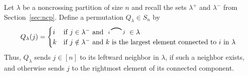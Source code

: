 \documentclass[12pt]{amsart}
\theoremstyle{definition}
\theoremstyle{remark}
\numberwithin{equation}{section}
\newcommand{\edge}[2]{\tikz[scale = 0.75, baseline = -0.2cm]{
\draw (0.1, 0) node[inner sep = 0ex] (a) {};
\node[left, xshift = 0.1cm, yshift = -0.1cm] at (a) {$\scriptstyle #1$};
\draw (0.9, 0)  node[inner sep = 0ex] (b) {};
\node[right, xshift = -0.1cm, yshift = -0.1cm] at (b) {$\scriptstyle #2$};
\draw[thick] (a) to[out = 35, in = 145] (b);}}
\begin{document}
Let $\lambda$ be a noncrossing partition of size $n$ and recall the sets $\lambda^{+}$ and $\lambda^{-}$ from Section~\ref{sec:ncp}.  
Define a permutation $Q_{\lambda} \in S_{n}$ by 
\[
Q_{\lambda}(j) = \begin{cases} i & \text{if $j \in \lambda^{-}$ and $ \edge{i}{j} \in \lambda$} \\
k & \text{if $j \notin \lambda^{-}$ and $k$ is the largest element connected to $i$ in $\lambda$}
\end{cases}
\]
Thus, $Q_{\lambda}$ sends $j \in [n]$ to its leftward neighbor in $\lambda$, if such a neighbor exists, and otherwise sends $j$ to the rightmost element of its connected component.  
\end{document}
